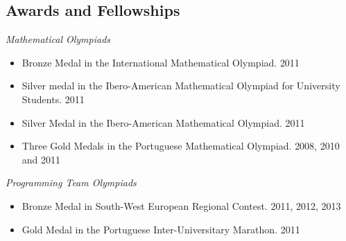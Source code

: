\documentclass[margin, 10pt]{res} %
\begin{document}
\begin{resume}
\section{Awards and Fellowships}

{\sl Mathematical Olympiads}
\begin{itemize} \itemsep -2pt %
\item Bronze Medal in the International Mathematical Olympiad. {\tiny 2011}
\item Silver medal in the Ibero-American Mathematical Olympiad for
University Students. {\tiny 2011}
\item Silver Medal in the Ibero-American Mathematical Olympiad. {\tiny 2011}
\item Three Gold Medals in the Portuguese Mathematical Olympiad. {\tiny 2008, 2010 and 2011}
\end{itemize}


\vspace{-0.2cm}

{\sl Programming Team Olympiads}
\begin{itemize} 
\item Bronze Medal in South-West European Regional Contest. {\tiny 2011, 2012, 2013}
\item Gold Medal in the Portuguese Inter-Universitary Marathon. {\tiny 2011}
\end{itemize} 
\vspace{-0.2cm}



\end{resume}
\end{document}
